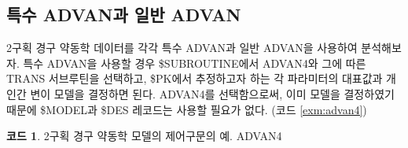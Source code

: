 \documentclass[
  10pt,
  krantz2,
  a4paper]{krantz}
\theoremstyle{definition}
\theoremstyle{definition}
\newtheorem{example}{코드}[chapter]
\theoremstyle{definition}
\theoremstyle{remark}
\begin{document}
\hypertarget{uxd2b9uxc218-advanuxacfc-uxc77cuxbc18-advan}{%
\subsection{\texorpdfstring{특수 ADVAN과 일반 ADVAN}{특수 ADVAN과 일반 ADVAN}}\label{uxd2b9uxc218-advanuxacfc-uxc77cuxbc18-advan}}

2구획 경구 약동학 데이터를 각각 특수 ADVAN과 일반 ADVAN을 사용하여 분석해보자. 특수 ADVAN을 사용할 경우 \$SUBROUTINE에서 ADVAN4와 그에 따른 TRANS 서브루틴을 선택하고, \$PK에서 추정하고자 하는 각 파라미터의 대표값과 개인간 변이 모델을 결정하면 된다. ADVAN4를 선택함으로써, 이미 모델을 결정하였기 때문에 \$MODEL과 \$DES 레코드는 사용할 필요가 없다. (코드 \ref{exm:advan4})

\begin{example}
\protect\hypertarget{exm:advan4}{}{\label{exm:advan4} }2구획 경구 약동학 모델의 제어구문의 예. ADVAN4
\end{example}
\end{document}
